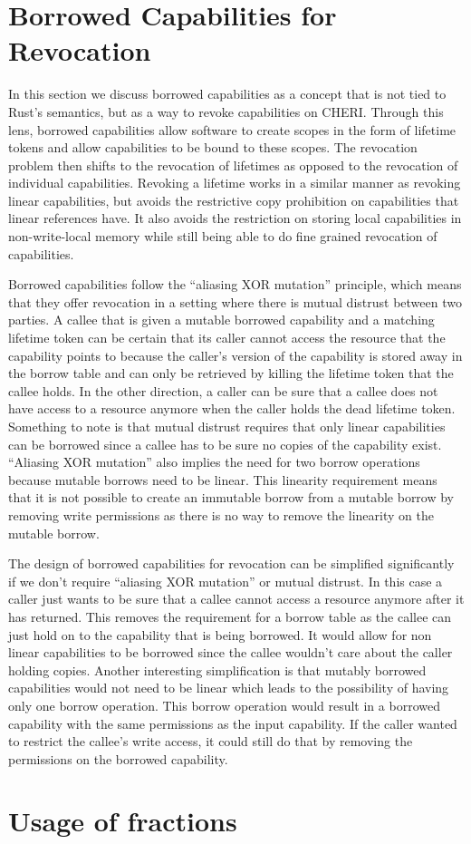 \section{Borrowed Capabilities for Revocation}
In this section we discuss borrowed capabilities as a concept that is not tied to Rust's semantics, but as a way to revoke capabilities on CHERI.
Through this lens, borrowed capabilities allow software to create scopes in the form of lifetime tokens and allow capabilities to be bound to these scopes.
The revocation problem then shifts to the revocation of lifetimes as opposed to the revocation of individual capabilities.
Revoking a lifetime works in a similar manner as revoking linear capabilities, but avoids the restrictive copy prohibition on capabilities that linear references have.
It also avoids the restriction on storing local capabilities in non-write-local memory while still being able to do fine grained revocation of capabilities.

Borrowed capabilities follow the ``aliasing XOR mutation'' principle, which means that they offer revocation in a setting where there is mutual distrust between two parties.
A callee that is given a mutable borrowed capability and a matching lifetime token can be certain that its caller cannot access the resource that the capability points to because the caller's version of the capability is stored away in the borrow table and can only be retrieved by killing the lifetime token that the callee holds.
In the other direction, a caller can be sure that a callee does not have access to a resource anymore when the caller holds the dead lifetime token.
Something to note is that mutual distrust requires that only linear capabilities can be borrowed since a callee has to be sure no copies of the capability exist.
``Aliasing XOR mutation'' also implies the need for two borrow operations because mutable borrows need to be linear.
This linearity requirement means that it is not possible to create an immutable borrow from a mutable borrow by removing write permissions as there is no way to remove the linearity on the mutable borrow.

The design of borrowed capabilities for revocation can be simplified significantly if we don't require ``aliasing XOR mutation'' or mutual distrust.
In this case a caller just wants to be sure that a callee cannot access a resource anymore after it has returned.
This removes the requirement for a borrow table as the callee can just hold on to the capability that is being borrowed.
It would allow for non linear capabilities to be borrowed since the callee wouldn't care about the caller holding copies.
Another interesting simplification is that mutably borrowed capabilities would not need to be linear which leads to the possibility of having only one borrow operation.
This borrow operation would result in a borrowed capability with the same permissions as the input capability.
If the caller wanted to restrict the callee's write access, it could still do that by removing the permissions on the borrowed capability.

\section{Usage of fractions}
